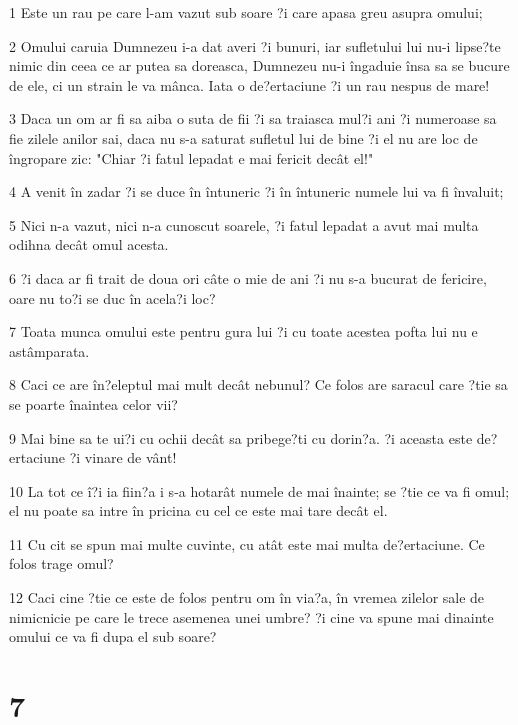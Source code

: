 \par 1 Este un rau pe care l-am vazut sub soare ?i care apasa greu asupra omului;
\par 2 Omului caruia Dumnezeu i-a dat averi ?i bunuri, iar sufletului lui nu-i lipse?te nimic din ceea ce ar putea sa doreasca, Dumnezeu nu-i îngaduie însa sa se bucure de ele, ci un strain le va mânca. Iata o de?ertaciune ?i un rau nespus de mare!
\par 3 Daca un om ar fi sa aiba o suta de fii ?i sa traiasca mul?i ani ?i numeroase sa fie zilele anilor sai, daca nu s-a saturat sufletul lui de bine ?i el nu are loc de îngropare zic: "Chiar ?i fatul lepadat e mai fericit decât el!"
\par 4 A venit în zadar ?i se duce în întuneric ?i în întuneric numele lui va fi învaluit;
\par 5 Nici n-a vazut, nici n-a cunoscut soarele, ?i fatul lepadat a avut mai multa odihna decât omul acesta.
\par 6 ?i daca ar fi trait de doua ori câte o mie de ani ?i nu s-a bucurat de fericire, oare nu to?i se duc în acela?i loc?
\par 7 Toata munca omului este pentru gura lui ?i cu toate acestea pofta lui nu e astâmparata.
\par 8 Caci ce are în?eleptul mai mult decât nebunul? Ce folos are saracul care ?tie sa se poarte înaintea celor vii?
\par 9 Mai bine sa te ui?i cu ochii decât sa pribege?ti cu dorin?a. ?i aceasta este de?ertaciune ?i vinare de vânt!
\par 10 La tot ce î?i ia fiin?a i s-a hotarât numele de mai înainte; se ?tie ce va fi omul; el nu poate sa intre în pricina cu cel ce este mai tare decât el.
\par 11 Cu cit se spun mai multe cuvinte, cu atât este mai multa de?ertaciune. Ce folos trage omul?
\par 12 Caci cine ?tie ce este de folos pentru om în via?a, în vremea zilelor sale de nimicnicie pe care le trece asemenea unei umbre? ?i cine va spune mai dinainte omului ce va fi dupa el sub soare?

\chapter{7}

